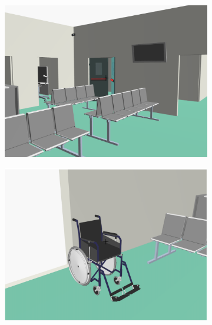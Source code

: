 \documentclass[]{egpubl}
\begin{document}
\begin{figure}[htbp]
\begin{subfigure}[b]{0.175\textwidth}
   \includegraphics[width=\textwidth]{images/emergency/4}
   \caption{}
   \end{subfigure}
\hspace{-3mm}   
   \begin{subfigure}[b]{0.175\textwidth}
   \includegraphics[width=\textwidth]{images/emergency/5}
   \caption{}
   \end{subfigure}
\hspace{-3mm}   
   \begin{subfigure}[b]{0.175\textwidth}

\end{subfigure}
\end{figure}
\end{document}
